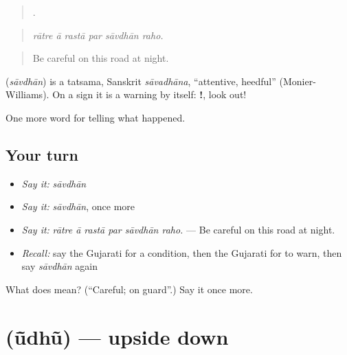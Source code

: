 \begin{quote}
     .
\end{quote}

\begin{quote}
\emph{rātre ā rastā par sāvdhān raho.}
\end{quote}

\begin{quote}
Be careful on this road at night.
\end{quote}

\begin{cousinweb}
\textbf{} (\emph{sāvdhān}) is a tatsama, Sanskrit \emph{sāvadhāna}, \textquotedblleft{}attentive, heedful\textquotedblright{} (Monier-Williams). On a sign it is a warning by itself: \textbf{!}, look out!
\end{cousinweb}

\begin{grammarlens}[title={What you've built}]
One more word for telling what happened.
\end{grammarlens}

\subsection*{Your turn}
\begin{itemize}
\raggedright
  \item \emph{Say it:} \emph{sāvdhān}
  \item \emph{Say it:} \emph{sāvdhān}, once more
  \item \emph{Say it:} \emph{rātre ā rastā par sāvdhān raho.} — Be careful on this road at night.
  \item \emph{Recall:} say the Gujarati for a condition, then the Gujarati for to warn, then say \emph{sāvdhān} again
\end{itemize}

\begin{tcolorbox}[breakable,colback=teal!4,colframe=teal!35!black,title={Before you move on}]
What does  mean? (\textquotedblleft{}Careful; on guard\textquotedblright{}.) Say it once more.
\end{tcolorbox}
\section[\texorpdfstring{\gu{ઊંધું} (ū̃dhũ)}{ઊંધું (ū̃dhũ)}]{ (ū̃dhũ) — upside down}

\label{lesson:GU-C297-udhu}




